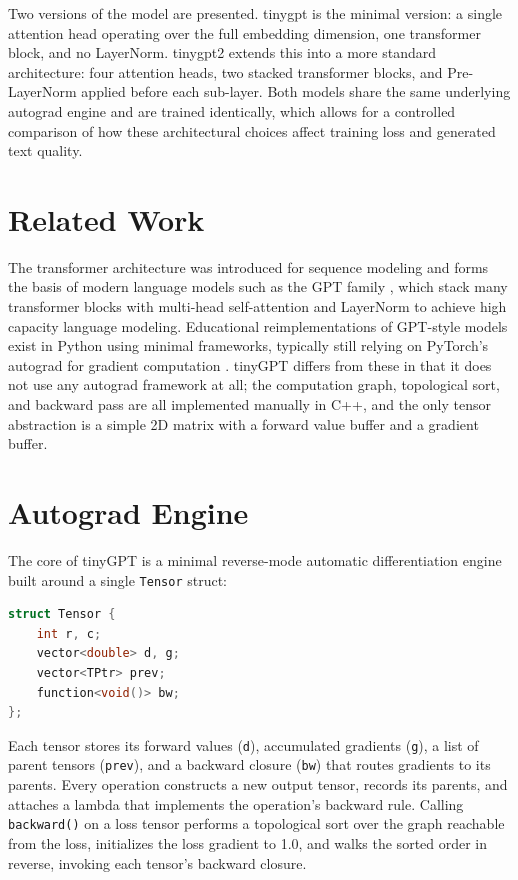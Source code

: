 \documentclass[conference]{IEEEtran}
\begin{document}
Two versions of the model are presented. tinygpt is the minimal version: a single attention head operating over the full embedding dimension, one transformer block, and no LayerNorm. tinygpt2 extends this into a more standard architecture: four attention heads, two stacked transformer blocks, and Pre-LayerNorm applied before each sub-layer. Both models share the same underlying autograd engine and are trained identically, which allows for a controlled comparison of how these architectural choices affect training loss and generated text quality.

\section{Related Work}
The transformer architecture was introduced for sequence modeling \cite{vaswani2017attention} and forms the basis of modern language models such as the GPT family \cite{radford2019gpt2}, which stack many transformer blocks with multi-head self-attention and LayerNorm to achieve high capacity language modeling. Educational reimplementations of GPT-style models exist in Python using minimal frameworks, typically still relying on PyTorch's autograd for gradient computation \cite{karpathy2022nanogpt}. tinyGPT differs from these in that it does not use any autograd framework at all; the computation graph, topological sort, and backward pass are all implemented manually in C++, and the only tensor abstraction is a simple 2D matrix with a forward value buffer and a gradient buffer.

\section{Autograd Engine}
The core of tinyGPT is a minimal reverse-mode automatic differentiation engine built around a single \texttt{Tensor} struct:

\begin{lstlisting}[language=C++]
struct Tensor {
    int r, c;
    vector<double> d, g;
    vector<TPtr> prev;
    function<void()> bw;
};
\end{lstlisting}

Each tensor stores its forward values (\texttt{d}), accumulated gradients (\texttt{g}), a list of parent tensors (\texttt{prev}), and a backward closure (\texttt{bw}) that routes gradients to its parents. Every operation constructs a new output tensor, records its parents, and attaches a lambda that implements the operation's backward rule. Calling \texttt{backward()} on a loss tensor performs a topological sort over the graph reachable from the loss, initializes the loss gradient to 1.0, and walks the sorted order in reverse, invoking each tensor's backward closure.
\end{document}
